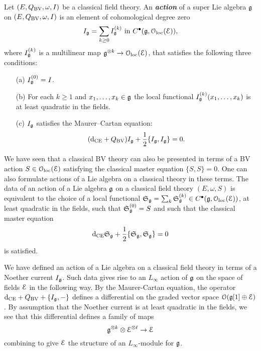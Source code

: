 \documentclass[10pt, oneside]{article}
\newcommand{\defterm}[1]{\textbf{\emph{#1}}}
\begin{document}
\begin{definition}
\label{infinitesimal_action_def}
Let $(E, Q_{\mathrm{BV}},\omega, I)$ be a classical field theory. 
An \defterm{action} of a super Lie algebra $\mathfrak g$ on $(E, Q_{\mathrm{BV}}, \omega, I)$ is an element of cohomological degree zero 
\[I_\mathfrak g = \sum_{k\geq 0} I_{\mathfrak g}^{(k)} \text{ in } C^\bullet(\mathfrak g, \mathcal{O}_{\rm loc}(\mathcal E)),\]
where $I_\mathfrak g^{(k)}$ is a multilinear map $\mathfrak g^{\otimes k} \to \mathcal{O}_{\rm loc}(\mathcal E)$, that satisfies the following three conditions:
\begin{itemize}
\item[(a)] $I_\mathfrak g^{(0)} = I$.
\item[(b)] For each $k \geq 1$ and $x_1, \ldots, x_k \in \mathfrak g$ the local functional $I^{(k)}_\mathfrak g (x_1,\ldots, x_k)$ is at least quadratic in the fields.
\item[(c)] $I_\mathfrak g$ satisfies the Maurer--Cartan equation:
\[({\rm d}_{\mathrm{CE}} + Q_{\mathrm{BV}}) I_\mathfrak g + \frac{1}{2} \{I_\mathfrak g, I_\mathfrak g\} = 0.\]
\end{itemize}
\end{definition}

\begin{remark}
We have seen that a classical BV theory can also be presented in terms of a BV action $S \in \mathcal{O}_{\rm loc}(\mathcal E)$ satisfying the classical master equation $\{S, S\} = 0$. 
One can also formulate actions of a Lie algebra on a classical theory in these terms. 
The data of an action of a Lie algebra $\mathfrak g$ on a classical field theory $(E, \omega, S)$ is equivalent to the choice of a local functional $\mathfrak S_\mathfrak g = \sum_k \mathfrak S_\mathfrak g^{(k)}\in C^\bullet(\mathfrak g, \mathcal{O}_{\rm loc}(\mathcal E))$, at least quadratic in the fields, such that $\mathfrak S^{(0)}_\mathfrak g = S$ and such that the classical master equation
\[
{\rm d}_{\mathrm{CE}} \mathfrak S_\mathfrak g + \frac{1}{2} \{\mathfrak S_\mathfrak g, \mathfrak S_\mathfrak g\} = 0 
\]
is satisfied.
\end{remark}

\begin{remark}
We have defined an action of a Lie algebra on a classical field theory in terms of a Noether current $I_\mathfrak g$.
Such data gives rise to an $L_\infty$ action of $\mathfrak g$ on the space of fields $\mathcal E$ in the following way.
By the Maurer-Cartan equation, the operator ${\rm d}_{\mathrm{CE}} + Q_{\mathrm{BV}} + \{I_\mathfrak g, -\}$ 
defines a differential on the graded vector space $\mathcal O(\mathfrak g[1] \oplus \mathcal E)$. 
By assumption that the Noether current is at least quadratic in the fields, we see that this differential defines a family of maps
\[
\mathfrak g^{\otimes k} \otimes \mathcal E^{\otimes \ell} \to \mathcal E
\]
combining to give $\mathcal E$ the structure of an $L_\infty$-module for $\mathfrak g$.
\end{remark}
\end{document}
